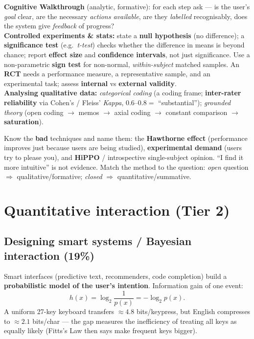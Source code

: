 \documentclass[11pt,a4paper]{article}
\begin{document}
\begin{useful}
\textbf{Cognitive Walkthrough} (analytic, formative): for each step ask --- is the user's \emph{goal} clear, are the necessary \emph{actions available}, are they \emph{labelled} recognisably, does the system give \emph{feedback} of progress?\\[3pt]
\textbf{Controlled experiments \& stats:} state a \textbf{null hypothesis} (no difference); a \textbf{significance test} (e.g.\ \emph{t-test}) checks whether the difference in means is beyond chance; report \textbf{effect size} and \textbf{confidence intervals}, not just significance. Use a non-parametric \textbf{sign test} for non-normal, \emph{within-subject} matched samples. An \textbf{RCT} needs a performance measure, a representative sample, and an experimental task; assess \textbf{internal} vs \textbf{external validity}.\\[3pt]
\textbf{Analysing qualitative data:} \emph{categorical coding} (a coding frame; \textbf{inter-rater reliability} via Cohen's / Fleiss' \emph{Kappa}, $0.6$--$0.8 =$ ``substantial''); \emph{grounded theory} (open coding $\to$ memos $\to$ axial coding $\to$ constant comparison $\to$ \textbf{saturation}).
\end{useful}

\begin{gotcha}
Know the \textbf{bad} techniques and name them: the \textbf{Hawthorne effect} (performance improves just because users are being studied), \textbf{experimental demand} (users try to please you), and \textbf{HiPPO} / introspective single-subject opinion. ``I find it more intuitive'' is not evidence. Match the method to the question: \emph{open} question $\Rightarrow$ qualitative/formative; \emph{closed} $\Rightarrow$ quantitative/summative.
\end{gotcha}

\section{Quantitative interaction (Tier 2)}

\subsection{Designing smart systems / Bayesian interaction (19\%)}

Smart interfaces (predictive text, recommenders, code completion) build a \textbf{probabilistic model of the user's intention}. Information gain of one event:
\[
  h(x) = \log_2\frac{1}{p(x)} = -\log_2 p(x).
\]
A uniform 27-key keyboard transfers $\approx 4.8$ bits/keypress, but English compresses to $\approx 2.1$ bits/char --- the gap measures the inefficiency of treating all keys as equally likely (Fitts's Law then says make frequent keys bigger).
\end{document}
